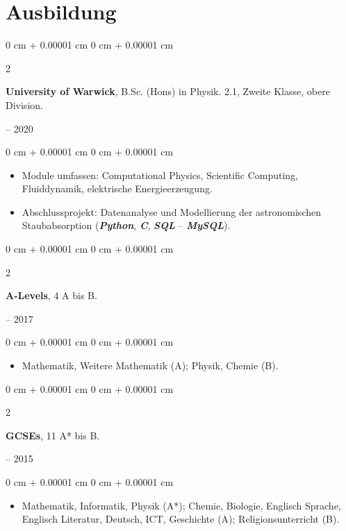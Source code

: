 \documentclass[10pt, letterpaper]{article}
\newenvironment{highlights}{
    \begin{itemize}[
        topsep=0.2 cm,
        parsep=0.2 cm,
        partopsep=0pt,
        itemsep=0.025 cm,
        leftmargin=0 cm + 10pt
    ]
}{
    \end{itemize}
}
\newenvironment{onecolentry}{
    \begin{adjustwidth}{
        0 cm + 0.00001 cm
    }{
        0 cm + 0.00001 cm
    }
}{
    \end{adjustwidth}
}
\newenvironment{twocolentry}[2][]{
    \onecolentry
    \def\secondColumn{#2}
    \setcolumnwidth{\fill, 4.75 cm}
    \begin{paracol}{2}
}{
    \switchcolumn \raggedleft \secondColumn
    \end{paracol}
    \endonecolentry
}
\begin{document}
        \vspace{0.15 cm}

    \section{Ausbildung}
        \begin{twocolentry}{
            2017 – 2020
        }
            \textbf{University of Warwick}, B.Sc. (Hons) in Physik. 2.1, Zweite Klasse, obere Division.
        \end{twocolentry}

        \vspace{0.10 cm}
        \begin{onecolentry}
            \begin{highlights}
                \item Module umfassen: Computational Physics, Scientific Computing, Fluiddynamik, elektrische Energieerzeugung.
                \item Abschlussprojekt: Datenanalyse und Modellierung der astronomischen Staubabsorption (\textbf{\textit{Python}}, \textbf{\textit{C}}, \textbf{\textit{SQL}} -- \textbf{\textit{MySQL}}).
            \end{highlights}
        \end{onecolentry}
        \vspace{0.20 cm}

        \begin{twocolentry}{
            2015 – 2017
        }
            \textbf{A-Levels}, 4 A bis B.
        \end{twocolentry}

        \vspace{0.10 cm}
        \begin{onecolentry}
            \begin{highlights}
                \item Mathematik, Weitere Mathematik (A); Physik, Chemie (B).
            \end{highlights}
        \end{onecolentry}

        \vspace{0.20 cm}
        \begin{twocolentry}{
            2010 – 2015
        }
            \textbf{GCSEs}, 11 A* bis B.
        \end{twocolentry}

        \vspace{0.10 cm}
        \begin{onecolentry}
            \begin{highlights}
            \item Mathematik, Informatik, Physik (A*); Chemie, Biologie, Englisch Sprache, Englisch Literatur, Deutsch, ICT, Geschichte (A); Religionsunterricht (B).
            \end{highlights}
        \end{onecolentry}
\end{document}
